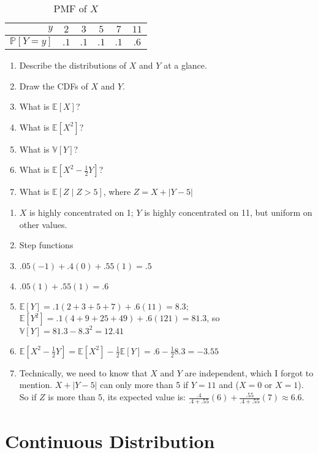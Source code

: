 \documentclass{article}
\newenvironment{solution}{\color{red}}{\color{black}}
\begin{document}
\begin{table}[htbp]
\centering
\begin{tabular}{r|ccccc}
$y$ & $2$ & $3$ & $5$ & $7$ & $11$ \\
\hline
$\mathbb{P}[Y = y]$ & $.1$ & $.1$ & $.1$ & $.1$ & $.6$ \\
\end{tabular}
\caption{PMF of $X$}
\label{tbl:y_dist}
\end{table}

\begin{enumerate}
\item Describe the distributions of $X$ and $Y$ at a glance.
\item Draw the CDFs of $X$ and $Y$.
\item What is $\mathbb{E}[X]$?
\item What is $\mathbb{E}[X^2]$?
\item What is $\mathbb{V}[Y]$?
\item What is $\mathbb{E}[X^2 - \frac12 Y]$?
\item What is $\mathbb{E}[Z \mid Z > 5]$, where $Z = X + |Y - 5|$
\end{enumerate}

\begin{solution}
\begin{enumerate}
\item $X$ is highly concentrated on 1; $Y$ is highly concentrated on 11, but uniform on other values.
\item Step functions
\item $.05(-1) + .4(0) + .55(1) = .5$
\item $.05(1) + .55(1) = .6$
\item $\mathbb{E}[Y] = .1(2 + 3 + 5 + 7) + .6(11) = 8.3$; $\mathbb{E}[Y^2] = .1(4 + 9 + 25 + 49) + .6(121) = 81.3$, so $\mathbb{V}[Y] = 81.3 - 8.3^2 = 12.41$
\item $\mathbb{E}[X^2 - \frac12 Y] = \mathbb{E}[X^2] - \frac12 \mathbb{E}[Y] = .6 - \frac12 8.3 = -3.55$
\item Technically, we need to know that $X$ and $Y$ are independent, which I forgot to mention. $X + |Y - 5|$ can only more than 5 if $Y = 11$ and ($X = 0$ or $X = 1$). So if $Z$ is more than 5, its expected value is: $\frac{.4}{.4 + .55}(6) + \frac{.55}{.4 + .55}(7) \approx 6.6$.
\end{enumerate}
\end{solution}

\section{Continuous Distribution}
\end{document}
